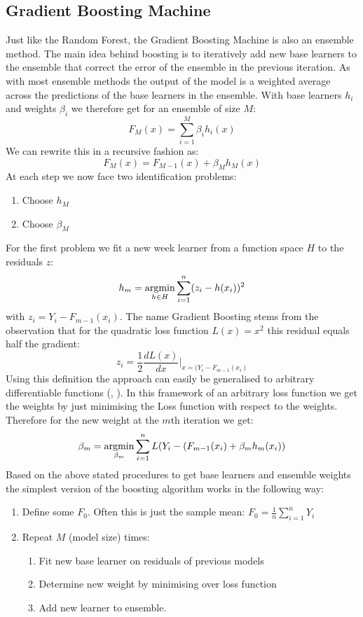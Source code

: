 \subsection{Gradient Boosting Machine}
Just like the Random Forest, the Gradient Boosting Machine is also an ensemble method. The main idea behind boosting is to iteratively add new base learners to the ensemble that correct the error of the ensemble in the previous iteration. As with most ensemble methods the output of the model is a weighted average across the predictions of the base learners in the ensemble. With base learners $h_i$ and weights $\beta_i$ we therefore get for an ensemble of size $M$:
$$F_M(x) = \sum_{i = 1}^M \beta_i h_i(x)$$ 
We can rewrite this in a recursive fashion as:
$$F_M(x) = F_{M-1}(x) + \beta_M h_M(x)$$
At each step we now face two identification problems:
\begin{enumerate}
\item Choose $h_M$
\item Choose $\beta_M$
\end{enumerate}
For the first problem we fit a new week learner from a function space $H$ to the residuals $z$:
$$h_m = \operatorname*{argmin}_{h \in H} \sum_{i = 1}^n (z_i - h(x_i))^2$$
with $z_i = Y_i - F_{m-1}(x_i)$. The name Gradient Boosting stems from the observation that for the quadratic loss function $L(x) = x^2$ this residual equals half the gradient:
$$z_i = \frac{1}{2}\frac{dL(x)}{dx}|_{x = (Y_i - F_{m-1}(x_i)}$$
Using this definition the approach can easily be generalised to arbitrary differentiable functions (\cite{friedman_greedy_2001}, \cite{friedman_stochastic_2002}). 
In this framework of an arbitrary loss function we get the weights by just minimising the Loss function with respect to the weights. Therefore for the new weight at the $m$th iteration we get:
$$\beta_m = \operatorname*{argmin}_{\beta_m} \sum_{i = 1}^n L(Y_i - (F_{m-1}(x_i) + \beta_m h_m(x_i))$$
Based on the above stated procedures to get base learners and ensemble weights the simplest version of the boosting algorithm works in the following way:
\begin{enumerate}
\item Define some $F_0$. Often this is just the sample mean: $F_0 = \frac{1}{n}\sum_{i=1}^n Y_i$
\item Repeat $M$ (model size) times:
\begin{enumerate}
\item Fit new base learner on residuals of previous models
\item Determine new weight by minimising over loss function
\item Add new learner to ensemble.
\end{enumerate}
\end{enumerate}
